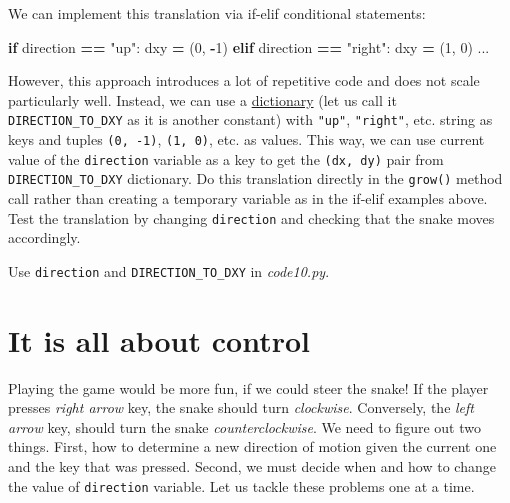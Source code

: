 \documentclass[
]{book}
\newenvironment{Shaded}{\begin{snugshade}}{\end{snugshade}}
\newcommand{\ControlFlowTok}[1]{\textcolor[rgb]{0.13,0.29,0.53}{\textbf{#1}}}
\newcommand{\DecValTok}[1]{\textcolor[rgb]{0.00,0.00,0.81}{#1}}
\newcommand{\NormalTok}[1]{#1}
\newcommand{\OperatorTok}[1]{\textcolor[rgb]{0.81,0.36,0.00}{\textbf{#1}}}
\newcommand{\StringTok}[1]{\textcolor[rgb]{0.31,0.60,0.02}{#1}}
\begin{document}
We can implement this translation via if-elif conditional statements:

\begin{Shaded}
\begin{Highlighting}[]
\ControlFlowTok{if}\NormalTok{ direction }\OperatorTok{==} \StringTok{"up"}\NormalTok{:}
\NormalTok{  dxy }\OperatorTok{=}\NormalTok{ (}\DecValTok{0}\NormalTok{, }\OperatorTok{{-}}\DecValTok{1}\NormalTok{)}
\ControlFlowTok{elif}\NormalTok{ direction }\OperatorTok{==} \StringTok{"right"}\NormalTok{:}
\NormalTok{  dxy }\OperatorTok{=}\NormalTok{ (}\DecValTok{1}\NormalTok{, }\DecValTok{0}\NormalTok{)}
\NormalTok{  ...}
\end{Highlighting}
\end{Shaded}

However, this approach introduces a lot of repetitive code and does not scale particularly well. Instead, we can use a \protect\hyperlink{dictionaries}{dictionary} (let us call it \texttt{DIRECTION\_TO\_DXY} as it is another constant) with \texttt{"up"}, \texttt{"right"}, etc. string as keys and tuples \texttt{(0,\ -1)}, \texttt{(1,\ 0)}, etc. as values. This way, we can use current value of the \texttt{direction} variable as a key to get the \texttt{(dx,\ dy)} pair from \texttt{DIRECTION\_TO\_DXY} dictionary. Do this translation directly in the \texttt{grow()} method call rather than creating a temporary variable as in the if-elif examples above. Test the translation by changing \texttt{direction} and checking that the snake moves accordingly.

Use \texttt{direction} and \texttt{DIRECTION\_TO\_DXY} in \emph{code10.py}.

\hypertarget{it-is-all-about-control}{%
\section{It is all about control}\label{it-is-all-about-control}}

Playing the game would be more fun, if we could steer the snake! If the player presses \emph{right arrow} key, the snake should turn \emph{clockwise}. Conversely, the \emph{left arrow} key, should turn the snake \emph{counterclockwise}. We need to figure out two things. First, how to determine a new direction of motion given the current one and the key that was pressed. Second, we must decide when and how to change the value of \texttt{direction} variable. Let us tackle these problems one at a time.
\end{document}
